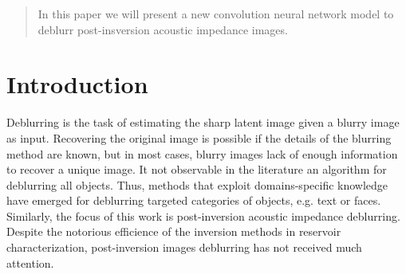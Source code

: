 \documentclass[conference,compsoc]{IEEEtran}
\begin{document}




\maketitle

\begin{abstract}
In this paper we will present a new convolution neural network
model to deblurr post-insversion acoustic impedance images.

\end{abstract}





%
\IEEEpeerreviewmaketitle



\section{Introduction}
Deblurring is the task of estimating the sharp latent image
given a blurry image as input. Recovering the original image
is possible if the details of the blurring method are known, but
in most cases, blurry images lack of enough information
to recover a unique image. It not observable in the literature
an algorithm for deblurring all objects. Thus, methods that exploit
domains-specific knowledge have emerged for deblurring
targeted categories of objects, e.g. text or faces. Similarly,
the focus of this work is post-inversion acoustic impedance deblurring.
Despite the notorious efficience of the inversion methods in reservoir
characterization, post-inversion images deblurring has not
received much attention.
\end{document}
